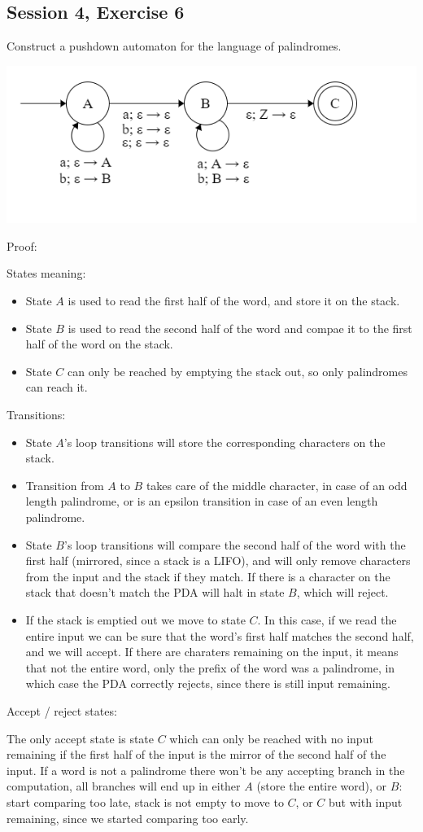 \subsection{Session 4, Exercise 6}


Construct a pushdown automaton for the language of palindromes.


\includegraphics[width=0.5\linewidth]{04/4_6.png}

Proof:

States meaning:
\begin{itemize}
    \item State $A$ is used to read the first half of the word, and store it on the stack.
    \item State $B$ is used to read the second half of the word and compae it to the first half of the word on the stack.
    \item State $C$ can only be reached by emptying the stack out, so only palindromes can reach it.
\end{itemize}

Transitions:

\begin{itemize}
    \item State $A$'s loop transitions will store the corresponding characters on the stack.
    \item Transition from $A$ to $B$ takes care of the middle character, in case of an odd length palindrome, or is an epsilon transition in case of an even length palindrome.
    \item State $B$'s loop transitions will compare the second half of the word with the first half (mirrored, since a stack is a LIFO), and will only remove characters from the input and the stack if they match. If there is a character on the stack that doesn't match the PDA will halt in state $B$, which will reject.
    \item If the stack is emptied out we move to state $C$. In this case, if we read the entire input we can be sure that the word's first half matches the second half, and we will accept. If there are charaters remaining on the input, it means that not the entire word, only the prefix of the word was a palindrome, in which case the PDA correctly rejects, since there is still input remaining.
\end{itemize}

Accept / reject states:

The only accept state is state $C$ which can only be reached with no input remaining if the first half of the input is the mirror of the second half of the input. If a word is not a palindrome there won't be any accepting branch in the computation, all branches will end up in either $A$ (store the entire word), or $B$: start comparing too late, stack is not empty to move to $C$, or $C$ but with input remaining, since we started comparing too early.